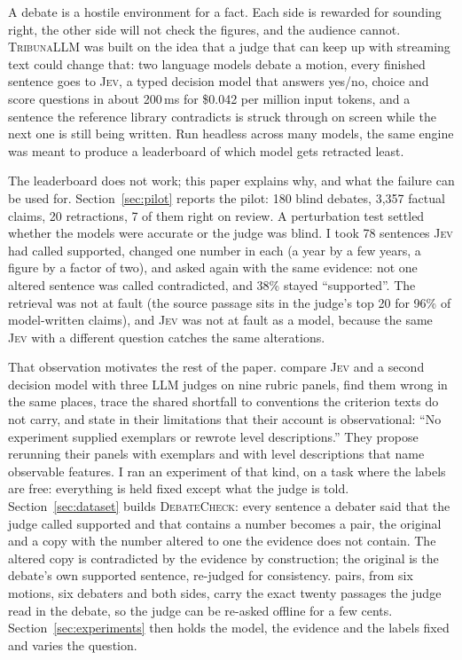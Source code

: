 \documentclass[11pt,a4paper]{article}
\newcommand{\jev}{\textsc{Jev}}
\newcommand{\dc}{\textsc{DebateCheck}}
\newcommand{\tribuna}{\textsc{TribunaLLM}}
\begin{document}
A debate is a hostile environment for a fact. Each side is rewarded for sounding right, the other side will not check the figures, and the audience cannot. \tribuna{} was built on the idea that a judge that can keep up with streaming text could change that: two language models debate a motion, every finished sentence goes to \jev{}, a typed decision model that answers yes/no, choice and score questions in about 200\,ms for \$0.042 per million input tokens, and a sentence the reference library contradicts is struck through on screen while the next one is still being written. Run headless across many models, the same engine was meant to produce a leaderboard of which model gets retracted least.

The leaderboard does not work; this paper explains why, and what the failure can be used for. Section~\ref{sec:pilot} reports the pilot: 180 blind debates, 3,357 factual claims, 20 retractions, 7 of them right on review. A perturbation test settled whether the models were accurate or the judge was blind. I took 78 sentences \jev{} had called supported, changed one number in each (a year by a few years, a figure by a factor of two), and asked again with the same evidence: not one altered sentence was called contradicted, and 38\% stayed ``supported''. The retrieval was not at fault (the source passage sits in the judge's top 20 for 96\% of model-written claims), and \jev{} was not at fault as a model, because the same \jev{} with a different question catches the same alterations.

That observation motivates the rest of the paper. \citet{rao2026jev} compare \jev{} and a second decision model with three LLM judges on nine rubric panels, find them wrong in the same places, trace the shared shortfall to conventions the criterion texts do not carry, and state in their limitations that their account is observational: ``No experiment supplied exemplars or rewrote level descriptions.'' They propose rerunning their panels with exemplars and with level descriptions that name observable features. I ran an experiment of that kind, on a task where the labels are free: everything is held fixed except what the judge is told. Section~\ref{sec:dataset} builds \dc{}: every sentence a debater said that the judge called supported and that contains a number becomes a pair, the original and a copy with the number altered to one the evidence does not contain. The altered copy is contradicted by the evidence by construction; the original is the debate's own supported sentence, re-judged for consistency. \nPairs{} pairs, from six motions, six debaters and both sides, carry the exact twenty passages the judge read in the debate, so the judge can be re-asked offline for a few cents. Section~\ref{sec:experiments} then holds the model, the evidence and the labels fixed and varies the question.
\end{document}
